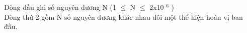 Dòng đầu ghi số nguyên dương N (1  $\le$  N  $\le$  2x10 $^ 6 $ )
\\Dòng thứ 2 gồm N số nguyên dương khác nhau đôi một thể hiện hoán vị ban đầu.